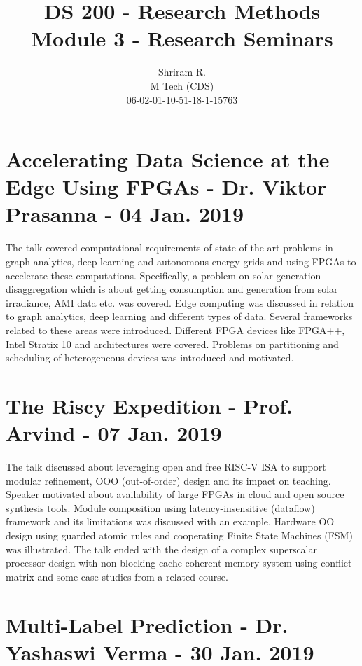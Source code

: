 \documentclass[11pt,a4paper,oneside]{article}
\begin{document}
	\title{DS 200 - Research Methods \\ Module 3 - Research Seminars}
	\author{Shriram R. \\ M Tech (CDS) \\ 06-02-01-10-51-18-1-15763}
	\maketitle	
	
	\section{Accelerating Data Science at the Edge Using FPGAs - Dr. Viktor Prasanna - 04 Jan. 2019}
	
	The talk covered computational requirements of state-of-the-art problems in graph analytics, deep learning and autonomous energy grids and using FPGAs to accelerate these computations. Specifically, a problem on solar generation disaggregation which is about getting consumption and generation from solar irradiance, AMI data etc. was covered. Edge computing was discussed in relation to graph analytics, deep learning and different types of data. Several frameworks related to these areas were introduced. Different FPGA devices like FPGA++, Intel Stratix 10 and architectures were covered. Problems on partitioning and scheduling of heterogeneous devices was introduced and motivated. 
	
	
	\section{The Riscy Expedition - Prof. Arvind - 07 Jan. 2019}
	
	The talk discussed about leveraging open and free RISC-V ISA to support modular refinement, OOO (out-of-order) design and its impact on teaching. Speaker motivated about availability of large FPGAs in cloud and open source synthesis tools. Module composition using latency-insensitive (dataflow) framework and its limitations was discussed with an example. Hardware OO design using guarded atomic rules and cooperating Finite State Machines (FSM) was illustrated. The talk ended with the design of a complex superscalar processor design with non-blocking cache coherent memory system using conflict matrix and some case-studies from a related course.
	
	\section{Multi-Label Prediction - Dr. Yashaswi Verma  - 30 Jan. 2019}
	
\end{document}
